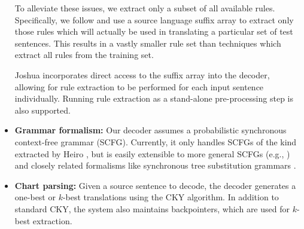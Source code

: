 \documentclass[11pt]{article}
\begin{document}
\begin{itemize}



To alleviate these issues, we extract only a subset of all available rules. Specifically, we follow  and use a source language suffix array to extract only those rules which will actually be used in translating a particular set of test sentences. This results in a vastly smaller rule set than techniques which extract all rules from the training set.

Joshua incorporates direct access to the suffix array into the decoder, allowing for rule extraction to be performed for each input sentence individually. Running rule extraction as a stand-alone pre-processing step is also supported.



\item \textbf{Grammar formalism:} Our decoder assumes a probabilistic synchronous context-free grammar (SCFG). Currently, it only handles SCFGs of the kind extracted by Heiro \cite{Chiang2007}, but is easily extensible to more general SCFGs (e.g., \cite{Galley2006}) and closely related formalisms like synchronous tree substitution grammars \cite{Eisner2003}.

\item \textbf{Chart parsing:} Given a source sentence to decode, the decoder generates a one-best or $k$-best translations using the CKY algorithm. 
In addition to standard CKY, the system also maintains backpointers, which are used for $k$-best extraction.


\end{itemize}
\end{document}
